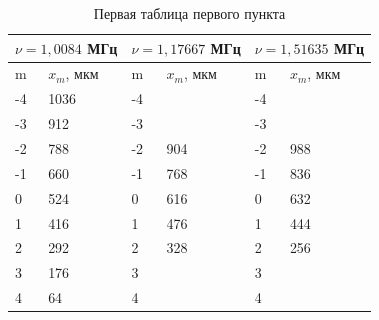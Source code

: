 \documentclass[a4paper,12pt]{article} %
\begin{document}
\begin{table}[H]
\begin{tabular}{|ll|ll|ll|}
\hline
\multicolumn{2}{|l|}{$\nu = 1,0084$ МГц} & \multicolumn{2}{c|}{$\nu = 1,17667 $ МГц} & \multicolumn{2}{l|}{$\nu = 1,51635$ МГц} \\ \hline
\multicolumn{1}{|l|}{m}   & $x_{m}$, мкм & \multicolumn{1}{l|}{m}    & $x_{m}$, мкм  & \multicolumn{1}{l|}{m}   & $x_{m}$, мкм  \\ \hline
\multicolumn{1}{|l|}{-4}  & 1036         & \multicolumn{1}{l|}{-4}   &               & \multicolumn{1}{l|}{-4}  &               \\ \hline
\multicolumn{1}{|l|}{-3}  & 912          & \multicolumn{1}{l|}{-3}   &               & \multicolumn{1}{l|}{-3}  &               \\ \hline
\multicolumn{1}{|l|}{-2}  & 788          & \multicolumn{1}{l|}{-2}   & 904           & \multicolumn{1}{l|}{-2}  & 988           \\ \hline
\multicolumn{1}{|l|}{-1}  & 660          & \multicolumn{1}{l|}{-1}   & 768           & \multicolumn{1}{l|}{-1}  & 836           \\ \hline
\multicolumn{1}{|l|}{0}   & 524          & \multicolumn{1}{l|}{0}    & 616           & \multicolumn{1}{l|}{0}   & 632           \\ \hline
\multicolumn{1}{|l|}{1}   & 416          & \multicolumn{1}{l|}{1}    & 476           & \multicolumn{1}{l|}{1}   & 444           \\ \hline
\multicolumn{1}{|l|}{2}   & 292          & \multicolumn{1}{l|}{2}    & 328           & \multicolumn{1}{l|}{2}   & 256           \\ \hline
\multicolumn{1}{|l|}{3}   & 176          & \multicolumn{1}{l|}{3}    &               & \multicolumn{1}{l|}{3}   &               \\ \hline
\multicolumn{1}{|l|}{4}   & 64           & \multicolumn{1}{l|}{4}    &               & \multicolumn{1}{l|}{4}   &               \\ \hline
\end{tabular}
\caption{Первая таблица первого пункта}
\end{table}
\end{document}
